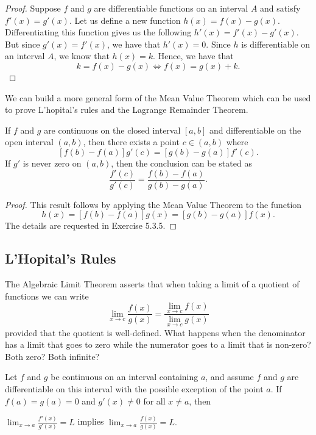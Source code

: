 \begin{proof}
Suppose \( f \) and \( g  \) are differentiable functions on an interval \( A  \) and satisfy \( f'(x) = g'(x)  \). Let us define a new function \( h(x) = f(x) - g(x)  \). Differentiating this function gives us the following \( h'(x) = f'(x) - g'(x)  \). But since \( g'(x) = f'(x)  \), we have that \( h'(x) = 0  \). Since \( h  \) is differentiable on an interval \( A  \), we know that \( h(x) = k  \). Hence, we have that 
\[  k = f(x) - g(x) \iff f(x) = g(x) + k. \]
\end{proof}

We can build a more general form of the Mean Value Theorem which can be used to prove L'hopital's rules and the Lagrange Remainder Theorem.

\begin{tcolorbox}
    \begin{thm}
    If \( f  \) and \( g  \) are continuous on the closed interval \( [a,b]  \) and differentiable on the open interval \( (a,b)  \), then there exists a point \( c \in (a,b)  \) where 
    \[  [f(b) -f(a)]g'(c) = [g(b) -g(a)]f'(c). \]
    If \( g'  \) is never zero on \( (a,b)  \), then the conclusion can be stated as 
    \[  \frac{ f'(c)  }{ g'(c)  } = \frac{ f(b) - f(a)  }{ g(b) - g(a)  }. \]
    \end{thm}
\end{tcolorbox}

\begin{proof}
This result follows by applying the Mean Value Theorem to the function 
\[  h(x) = [f(b) - f(a)] g(x) = [g(b) - g(a)] f(x).  \]
The details are requested in Exercise 5.3.5.
\end{proof}

\subsection{L'Hopital's Rules}

The Algebraic Limit Theorem asserts that when taking a limit of a quotient of functions we can write 
\[  \lim_{ x \to c  } \frac{ f(x)  }{ g(x)  } = \frac{ \lim_{ x \to c  } f(x)  }{ \lim_{ x \to c  } g(x)  }  \]
provided that the quotient is well-defined. What happens when the denominator has a limit that goes to zero while the numerator goes to a limit that is non-zero? Both zero? Both infinite?

\begin{tcolorbox}
    \begin{thm}
    Let \( f  \) and \( g  \) be continuous on an interval containing \( a  \), and assume \( f  \) and \( g  \) are differentiable on this interval with the possible exception of the point \( a  \). If \( f(a) = g(a) = 0  \) and \( g'(x) \neq 0  \) for all \( x \neq a  \), then 
    \begin{center}
        \( \lim_{ x \to a } \frac{ f'(x)  }{ g'(x)  } = L  \) implies \( \lim_{ x \to a } \frac{ f(x)  }{ g(x)  } = L. \)
    \end{center}
    \end{thm}
\end{tcolorbox}

